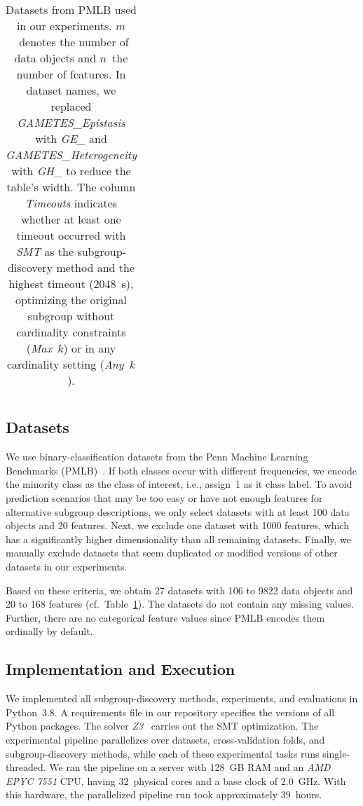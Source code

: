 \documentclass{article}
\theoremstyle{definition}
\begin{document}
\begin{table}[p]
\begin{tabular}{lrrll}
		\bottomrule
	\end{tabular}
	\caption{
		Datasets from PMLB used in our experiments.
		$m$~denotes the number of data objects and $n$~the number of features.
		In dataset names, we replaced \emph{GAMETES\_Epistasis} with  \emph{GE\_} and \emph{GAMETES\_Heterogeneity} with \emph{GH\_} to reduce the table's width.
		The column \emph{Timeouts} indicates whether at least one timeout occurred with \emph{SMT} as the subgroup-discovery method and the highest timeout (2048~s), optimizing the original subgroup without cardinality constraints (\emph{Max~$k$}) or in any cardinality setting (\emph{Any~$k$}).
	}
	\label{tab:afs:datasets}
\end{table}

\subsection{Datasets}
\label{sec:csd:experimental-design:datasets}

We use binary-classification datasets from the Penn Machine Learning Benchmarks (PMLB)~\cite{olson2017pmlb, romano2021pmlb}.
If both classes occur with different frequencies, we encode the minority class as the class of interest, i.e., assign~1 as it class label.
To avoid prediction scenarios that may be too easy or have not enough features for alternative subgroup descriptions, we only select datasets with at least 100 data objects and 20 features.
Next, we exclude one dataset with 1000 features, which has a significantly higher dimensionality than all remaining datasets.
Finally, we manually exclude datasets that seem duplicated or modified versions of other datasets in our experiments.

Based on these criteria, we obtain 27 datasets with 106 to 9822 data objects and 20 to 168 features (cf.~Table~\ref{tab:afs:datasets}).
The datasets do not contain any missing values.
Further, there are no categorical feature values since PMLB encodes them ordinally by default.

\subsection{Implementation and Execution}
\label{sec:csd:experimental-design:implementation}

We implemented all subgroup-discovery methods, experiments, and evaluations in Python~3.8.
A requirements file in our repository specifies the versions of all Python packages.
The solver \emph{Z3}~\cite{bjorner2015nuz, deMoura2008z3} carries out the SMT optimization.
The experimental pipeline parallelizes over datasets, cross-validation folds, and subgroup-discovery methods, while each of these experimental tasks runs single-threaded.
We ran the pipeline on a server with 128~GB RAM and an \emph{AMD EPYC 7551} CPU, having 32~physical cores and a base clock of 2.0~GHz.
With this hardware, the parallelized pipeline run took approximately 39~hours.
\end{document}
